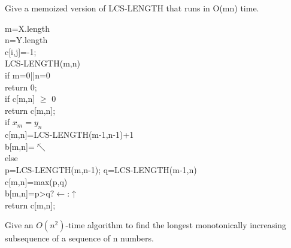 \documentclass[a4paper, justified]{tufte-handout}
\begin{document}
\begin{problem}[TC 15.4-3]
Give a memoized version of LCS-LENGTH that runs in O(mn) time.
\end{problem}

\begin{solution}
m=X.length\\
n=Y.length\\
c[i,j]=-1;\\
LCS-LENGTH(m,n)\\
\hspace*{0.6 cm} if m=0||n=0\\
\hspace*{1.6 cm}     return 0;\\
\hspace*{0.6 cm} if c[m,n] $\geqslant$ 0\\
\hspace*{1.6 cm}      return c[m,n];\\
\hspace*{0.6 cm} if $x_m=y_n$\\
\hspace*{1.6 cm}      c[m,n]=LCS-LENGTH(m-1,n-1)+1\\
\hspace*{1.6 cm}      b[m,n]=$\nwarrow$\\
\hspace*{0.6 cm} else\\
\hspace*{1.6 cm}      p=LCS-LENGTH(m,n-1); q=LCS-LENGTH(m-1,n)\\
\hspace*{1.6 cm}      c[m,n]=max(p,q)\\
\hspace*{1.6 cm}      b[m,n]=p>q?$\leftarrow$:$\uparrow$\\
\hspace*{0.6 cm} return c[m,n];
\end{solution}

\begin{problem}[TC 15.4-5]
Give an $O(n^2)$-time algorithm to find the longest monotonically increasing subsequence of a sequence of n numbers.
\end{problem}
\end{document}
